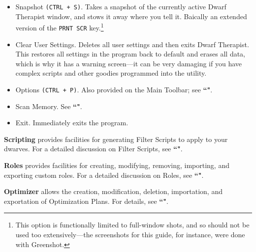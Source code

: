 \documentclass[]{article}
\begin{document}
\begin{itemize}

\item Snapshot \texttt{(CTRL + S)}. Takes a snapshot of the currently active Dwarf Therapist window,
and stows it away where you tell it. Baically an extended version of the \texttt{PRNT SCR}
key.\footnote{ This option is functionally limited to full-window shots, and so should not be used too
extensively---the screenshots for this guide, for instance, were done with Greenshot.}

\item Clear User Settings. Deletes all user settings and then exits Dwarf Therapist. This restores all
settings in the program back to default and erases all data, which is why it has a warning screen---it
can be very damaging if you have complex scripts and other goodies programmed into the utility.


\item Options \texttt{(CTRL + P)}. Also provided on the Main Toolbar; see 
\textbf{``"}.


\item Scan Memory. See \textbf{``"}.


\item Exit. Immediately exits the program.
\end{itemize}

\noindent \textbf{Scripting} provides facilities for generating Filter Scripts to apply to your dwarves.
For a detailed discussion on Filter Scripts, see \textbf{``"}.
\vspace{12pt}

\noindent \textbf{Roles} provides facilities for creating, modifying, removing, importing, and exporting
custom roles. For a detailed discussion on Roles, see \textbf{``"}.
\vspace{12pt}

\noindent \textbf{Optimizer} allows the creation, modification, deletion, importation, and exportation of
Optimization Plans. For details, see \textbf{``"}.
\vspace{12pt}
\end{document}
